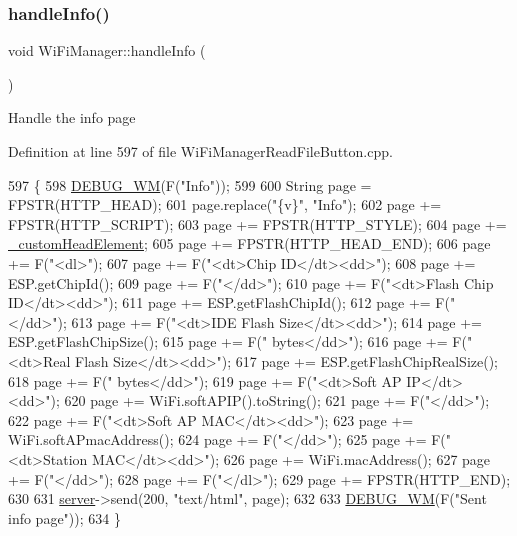 \subsubsection{\texorpdfstring{handle\+Info()}{handleInfo()}}
{\footnotesize\ttfamily void Wi\+Fi\+Manager\+::handle\+Info (\begin{DoxyParamCaption}{ }\end{DoxyParamCaption})\hspace{0.3cm}{\ttfamily [private]}}

Handle the info page 

Definition at line 597 of file Wi\+Fi\+Manager\+Read\+File\+Button.\+cpp.


\begin{DoxyCode}
597                              \{
598   \hyperlink{class_wi_fi_manager_ae5f595c670ccbcf9a191baf50f5c7c26}{DEBUG\_WM}(F(\textcolor{stringliteral}{"Info"}));
599 
600   String page = FPSTR(HTTP\_HEAD);
601   page.replace(\textcolor{stringliteral}{"\{v\}"}, \textcolor{stringliteral}{"Info"});
602   page += FPSTR(HTTP\_SCRIPT);
603   page += FPSTR(HTTP\_STYLE);
604   page += \hyperlink{class_wi_fi_manager_a8860012564a62209d750c50e56319192}{\_customHeadElement};
605   page += FPSTR(HTTP\_HEAD\_END);
606   page += F(\textcolor{stringliteral}{"<dl>"});
607   page += F(\textcolor{stringliteral}{"<dt>Chip ID</dt><dd>"});
608   page += ESP.getChipId();
609   page += F(\textcolor{stringliteral}{"</dd>"});
610   page += F(\textcolor{stringliteral}{"<dt>Flash Chip ID</dt><dd>"});
611   page += ESP.getFlashChipId();
612   page += F(\textcolor{stringliteral}{"</dd>"});
613   page += F(\textcolor{stringliteral}{"<dt>IDE Flash Size</dt><dd>"});
614   page += ESP.getFlashChipSize();
615   page += F(\textcolor{stringliteral}{" bytes</dd>"});
616   page += F(\textcolor{stringliteral}{"<dt>Real Flash Size</dt><dd>"});
617   page += ESP.getFlashChipRealSize();
618   page += F(\textcolor{stringliteral}{" bytes</dd>"});
619   page += F(\textcolor{stringliteral}{"<dt>Soft AP IP</dt><dd>"});
620   page += WiFi.softAPIP().toString();
621   page += F(\textcolor{stringliteral}{"</dd>"});
622   page += F(\textcolor{stringliteral}{"<dt>Soft AP MAC</dt><dd>"});
623   page += WiFi.softAPmacAddress();
624   page += F(\textcolor{stringliteral}{"</dd>"});
625   page += F(\textcolor{stringliteral}{"<dt>Station MAC</dt><dd>"});
626   page += WiFi.macAddress();
627   page += F(\textcolor{stringliteral}{"</dd>"});
628   page += F(\textcolor{stringliteral}{"</dl>"});
629   page += FPSTR(HTTP\_END);
630 
631   \hyperlink{class_wi_fi_manager_a509523a01c0395cf0dc235b074f2a5ea}{server}->send(200, \textcolor{stringliteral}{"text/html"}, page);
632 
633   \hyperlink{class_wi_fi_manager_ae5f595c670ccbcf9a191baf50f5c7c26}{DEBUG\_WM}(F(\textcolor{stringliteral}{"Sent info page"}));
634 \}
\end{DoxyCode}
